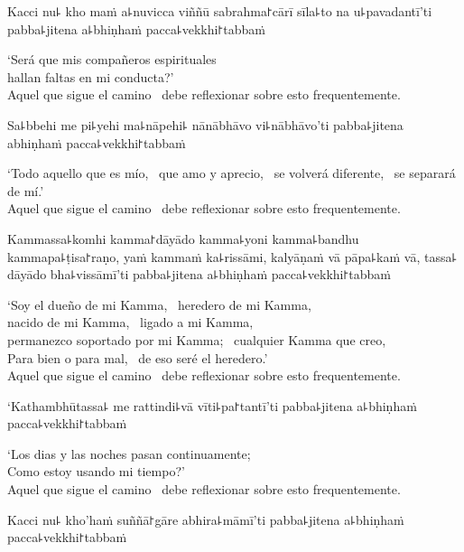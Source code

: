Kacci nu꜕ kho maṁ a꜕nuvicca viññū sabrahma꜓cārī sīla꜕to na u꜕pavadantī'ti pabba꜕jitena a꜕bhiṇhaṁ pacca꜕vekkhi꜓tabbaṁ

\begin{english}
  `Será que mis compañeros espirituales \pause\\
  hallan faltas en mi conducta?' \pause\\
  Aquel que sigue el camino \pause\ debe reflexionar sobre esto frequentemente.
\end{english}

Sa꜕bbehi me pi꜕yehi ma꜕nāpehi꜕ nānābhāvo vi꜕nābhāvo'ti pabba꜕jitena abhiṇhaṁ pacca꜕vekkhi꜓tabbaṁ

\begin{english}
  `Todo aquello que es mío, \pause\ que amo y aprecio, \pause\ se volverá diferente, \pause\ se separará de mí.' \pause\\
  Aquel que sigue el camino \pause\ debe reflexionar sobre esto frequentemente.
\end{english}

Kammassa꜕komhi kamma꜓dāyādo kamma꜕yoni kamma꜕bandhu kammapa꜕ṭisa꜓raṇo, yaṁ kammaṁ ka꜕rissāmi, kalyāṇaṁ vā pāpa꜕kaṁ vā, tassa꜕ dāyādo bha꜕vissāmī'ti pabba꜕jitena a꜕bhiṇhaṁ pacca꜕vekkhi꜓tabbaṁ

\begin{english}
  `Soy el dueño de mi Kamma, \pause\ heredero de mi Kamma, \pause\\
  nacido de mi Kamma, \pause\ ligado a mi Kamma, \pause\\
  permanezco soportado por mi Kamma; \pause\ cualquier Kamma que creo, \pause\\
  Para bien o para mal, \pause\ de eso seré el heredero.' \pause\\
  Aquel que sigue el camino \pause\ debe reflexionar sobre esto frequentemente.
\end{english}

\clearpage

`Kathambhūtassa꜕ me rattindi꜕vā vīti꜕pa꜓tantī'ti pabba꜕jitena a꜕bhiṇhaṁ pacca꜕vekkhi꜓tabbaṁ

\begin{english}
  `Los dias y las noches pasan continuamente; \pause\\
  Como estoy usando mi tiempo?' \pause\\
  Aquel que sigue el camino \pause\ debe reflexionar sobre esto frequentemente.
\end{english}

Kacci nu꜕ kho'haṁ suññā꜓gāre abhira꜕māmī'ti pabba꜕jitena a꜕bhiṇhaṁ pacca꜕vekkhi꜓tabbaṁ

